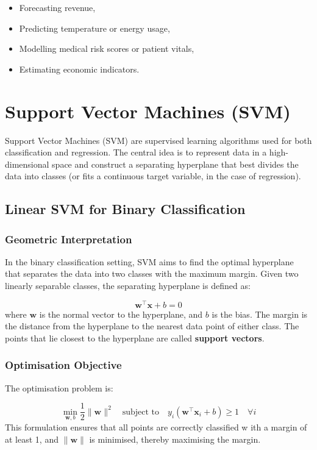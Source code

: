 \documentclass[9pt]{extarticle}
\begin{document}
\begin{itemize}
    \item Forecasting revenue,
    \item Predicting temperature or energy usage,
    \item Modelling medical risk scores or patient vitals,
    \item Estimating economic indicators.
\end{itemize}

\section{Support Vector Machines (SVM)}



Support Vector Machines (SVM) are supervised learning algorithms used for both classification and regression. The central idea is to represent data in a high-dimensional space and construct a separating hyperplane that best divides the data into classes (or fits a continuous target variable, in the case of regression).

\subsection{Linear SVM for Binary Classification}

\subsubsection*{Geometric Interpretation}

In the binary classification setting, SVM aims to find the optimal
 hyperplane that separates the data into two classes with the maximum margin. 
 Given two linearly separable classes, the separating hyperplane is defined as:

\[
\mathbf{w}^\top \mathbf{x} + b = 0
\]
where $\mathbf{w}$ is the normal vector to the hyperplane, and $b$ is the bias. The margin is the distance from the hyperplane to the nearest data point of 
either class. The points that lie closest to the hyperplane are called 
\textbf{support vectors}.

\subsubsection*{Optimisation Objective}

The optimisation problem is:

\[
\min_{\mathbf{w}, b} \frac{1}{2} \|\mathbf{w}\|^2
\quad \text{subject to} \quad
y_i(\mathbf{w}^\top \mathbf{x}_i + b) \geq 1 \quad \forall i
\]
This formulation ensures that all points are correctly classified w
ith a margin of at least 1, and $\|\mathbf{w}\|$ is minimised, thereby maximising the margin.
\end{document}
